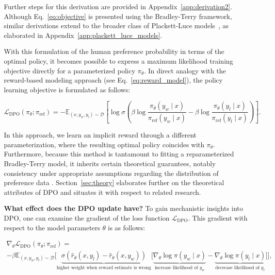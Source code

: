 Further steps for this derivation are provided in Appendix~\ref{app:derivation2}. Although Eq.~\ref{eq:objective} is presented using the Bradley-Terry framework, similar derivations extend to the broader class of Plackett-Luce models~\citep{plackett1975analysis, luce2012individual}, as elaborated in Appendix~\ref{app:plackett_luce_models}.

With this formulation of the human preference probability in terms of the optimal policy, it becomes possible to express a maximum likelihood training objective directly for a parameterized policy $\pi_\theta$. In direct analogy with the reward-based modeling approach (see Eq.~\ref{eq:reward_model}), the policy learning objective is formulated as follows:

\begin{equation}\label{eq:optimum_model}
    \mathcal{L}_\text{DPO}(\pi_{\theta}; \pi_\text{ref}) = -\mathbb{E}_{(x, y_w, y_l)\sim \mathcal{D}}\left[\log \sigma \left(\beta \log \frac{\pi_{\theta}(y_w\mid x)}{\pi_\text{ref}(y_w\mid x)} - \beta \log \frac{\pi_{\theta}(y_l\mid x)}{\pi_\text{ref}(y_l\mid x)}\right)\right].
\end{equation}

In this approach, we learn an implicit reward through a different parameterization, where the resulting optimal policy coincides with $\pi_\theta$. Furthermore, because this method is tantamount to fitting a reparameterized Bradley-Terry model, it inherits certain theoretical guarantees, notably consistency under appropriate assumptions regarding the distribution of preference data \cite{bong2022generalized}. Section~\ref{sec:theory} elaborates further on the theoretical attributes of DPO and situates it with respect to related research.

\textbf{What effect does the DPO update have?} To gain mechanistic insights into DPO, one can examine the gradient of the loss function $\mathcal{L}_\text{DPO}$. This gradient with respect to the model parameters $\theta$ is as follows:

\begin{multline*}\label{eq:gradient}
    \nabla_\theta \mathcal{L}_\text{DPO}(\pi_\theta;\pi_\text{ref}) = \\ -\beta\mathbb{E}_{(x, y_w, y_l) \sim \mathcal{D}} \bigg[\underbrace{\sigma(\hat{r}_\theta(x, y_l) - \hat{r}_\theta (x, y_w))}_\text{higher weight when reward estimate is wrong}\bigg[\underbrace{\nabla_\theta\log \pi(y_w \mid x)}_\text{increase likelihood of $y_w$} - \underbrace{\nabla_\theta\log\pi(y_l \mid x)}_\text{decrease likelihood of $y_l$}\bigg]\bigg],
\end{multline*}

